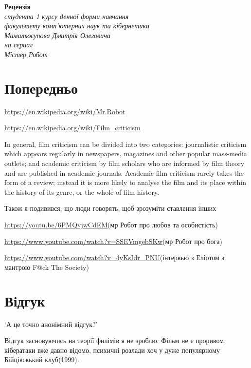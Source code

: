 \documentclass[a4paper,12pt]{article}
\begin{document}

    \begin{center}
        \textbf{Рецензія \\}
        \textit{
            студента 1 курсу денної форми навчання \\
            факультету комп'ютерних наук та кібернетики \\
            Маматюсупова Дмитрія Олеговича \\
            на сериал \\
            Містер Робот}

    \end{center}

    \section{Попередньо}
    \url{https://en.wikipedia.org/wiki/Mr.Robot}


    \url{https://en.wikipedia.org/wiki/Film_criticism}

    In general, film criticism can be divided into two categories: journalistic criticism which appears regularly in newspapers,
    magazines and other popular mass-media outlets; and academic criticism by film scholars who are informed by film
    theory and are published in academic journals. Academic film criticism rarely takes the form of a review;
    instead it is more likely to analyse the film and its place within the history of its genre, or the whole of film history.

    Також я подивився, що люди говорять, щоб зрозуміти ставлення інших

    \url{https://youtu.be/6PMQvjwCdEM}(мр Робот про любов та особистість)

    \url{https://www.youtube.com/watch?v=SSEVmgebSKw}(мр Робот про бога)

    \url{https://www.youtube.com/watch?v=4yKsIdr_PNU}(інтервью з Еліотом з мантрою F@ck The Society)


    \section{Відгук}
    `А це точно анонімний відгук?'

    Відгук засновуючись на теорії филімів я не зроблю.
    Фільм не є проривом, кібератаки вже давно відомо, психичні розлади хоч у дуже популярному Бійцівскький клуб(1999).
\end{document}
